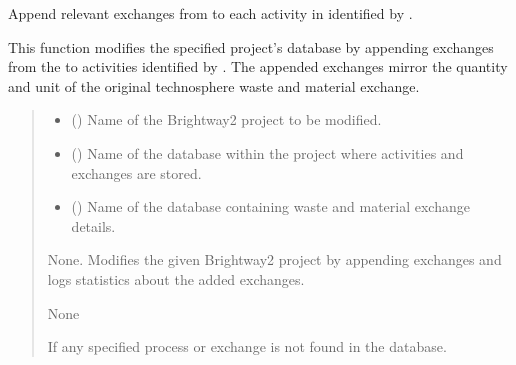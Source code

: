 \documentclass[letterpaper,10pt,english]{sphinxmanual}
\begin{document}
\begin{fulllineitems}
\label{\detokenize{WMFootprint_api:WasteAndMaterialFootprint.ExchangeEditor.ExchangeEditor}}
\pysigstartsignatures
{}
\pysigstopsignatures
\sphinxAtStartPar
Append relevant exchanges from  to each activity in  identified by .

\sphinxAtStartPar
This function modifies the specified project’s database by appending exchanges from the  to activities identified by . The appended exchanges mirror the quantity and unit of the original technosphere waste and material exchange.
\begin{quote}\begin{description}
\begin{itemize}
\item {} 
\sphinxAtStartPar
{} () \textendash{} Name of the Brightway2 project to be modified.

\item {} 
\sphinxAtStartPar
{} () \textendash{} Name of the database within the project where activities and exchanges are stored.

\item {} 
\sphinxAtStartPar
{} () \textendash{} Name of the database containing waste and material exchange details.

\end{itemize}

\sphinxAtStartPar
None. Modifies the given Brightway2 project by appending exchanges and logs statistics about the added exchanges.

\sphinxAtStartPar
None

\sphinxAtStartPar
{} \textendash{} If any specified process or exchange is not found in the database.

\end{description}\end{quote}

\end{fulllineitems}
\end{document}
